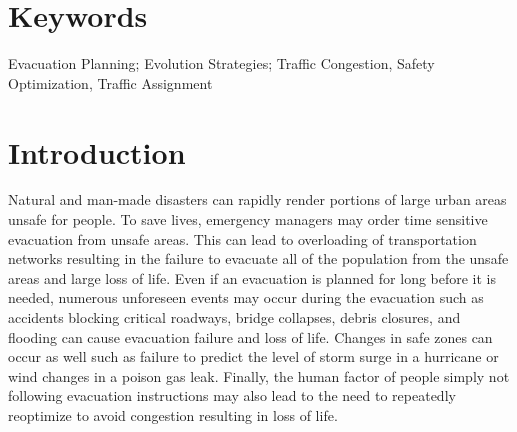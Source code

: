 \documentclass{sig-alternate-05-2015}
\begin{document}
\maketitle
\frenchspacing %

\begin{abstract}
In an urban disaster it is important to efficiently evacuate people to
safety.  We use evolution strategies and a probability model to route
the population by optimizing their safety.  The algorithm is designed
to use the strengths of evolutionary computing to repeatedly optimize
an evacuation under the dynamics of a disaster such as accidents
blocking critical roadways, bridge collapses, debris closures, changes
in safety, and people not following evacuation directions.  Our model
is unconcerned with specific evacuation routes but rather evolves a
robust cloud of probabilities to represent best directions of escape.
We show that maintaining a population of diverse solutions may allow
for rapid adaptation as a disaster unfolds.  The core optimization
algorithm is tested using challenging test cases as well as real-world
data.
\end{abstract}
\section*{Keywords}
Evacuation Planning; Evolution Strategies; Traffic
Congestion, Safety Optimization, Traffic Assignment

\section{Introduction}
Natural and man-made disasters can rapidly render portions of large
urban areas unsafe for people.  To save lives, emergency managers may
order time sensitive evacuation from unsafe areas.  This can lead to
overloading of transportation networks resulting in the failure to
evacuate all of the population from the unsafe areas and large loss of
life.  Even if an evacuation is planned for long before it is needed,
numerous unforeseen events may occur during the evacuation such as
accidents blocking critical roadways, bridge collapses, debris
closures, and flooding can cause evacuation failure and loss of life.
Changes in safe zones can occur as well such as failure to predict the
level of storm surge in a hurricane or wind changes in a poison gas
leak.  Finally, the human factor of people simply not following
evacuation instructions may also lead to the need to repeatedly
reoptimize to avoid congestion resulting in loss of life.
\end{document}
